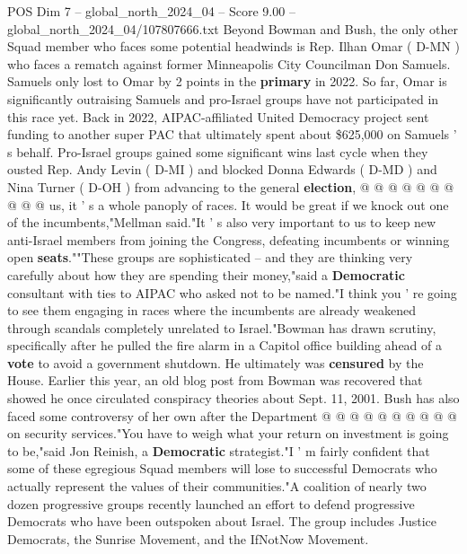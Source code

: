 \begin{textsample}{POS Dim 7 – global\_north\_2024\_04 – Score 9.00 – global\_north\_2024\_04/107807666.txt}
Beyond Bowman and Bush, the only other Squad member who faces some potential headwinds is Rep.
Ilhan Omar ( D-MN ) who faces a rematch against former Minneapolis City Councilman Don Samuels.
Samuels only lost to Omar by 2 points in the \textbf{primary} in 2022.
So far, Omar is significantly outraising Samuels and pro-Israel groups have not participated in this race yet.
Back in 2022, AIPAC-affiliated United Democracy project sent funding to another super PAC that ultimately spent about \$625,000 on Samuels ' s behalf.
Pro-Israel groups gained some significant wins last cycle when they ousted Rep.
Andy Levin ( D-MI ) and blocked Donna Edwards ( D-MD ) and Nina Turner ( D-OH ) from advancing to the general \textbf{election}, @ @ @ @ @ @ @ @ @ @ us, it ' s a whole panoply of races.
It would be great if we knock out one of the incumbents,"Mellman said."It ' s also very important to us to keep new anti-Israel members from joining the Congress, defeating incumbents or winning open \textbf{seats}.""These groups are sophisticated -- and they are thinking very carefully about how they are spending their money,"said a \textbf{Democratic} consultant with ties to AIPAC who asked not to be named."I think you ' re going to see them engaging in races where the incumbents are already weakened through scandals completely unrelated to Israel."Bowman has drawn scrutiny, specifically after he pulled the fire alarm in a Capitol office building ahead of a \textbf{vote} to avoid a government shutdown.
He ultimately was \textbf{censured} by the House.
Earlier this year, an old blog post from Bowman was recovered that showed he once circulated conspiracy theories about Sept. 11, 2001.
Bush has also faced some controversy of her own after the Department @ @ @ @ @ @ @ @ @ @ on security services."You have to weigh what your return on investment is going to be,"said Jon Reinish, a \textbf{Democratic} strategist."I ' m fairly confident that some of these egregious Squad members will lose to successful Democrats who actually represent the values of their communities."A coalition of nearly two dozen progressive groups recently launched an effort to defend progressive Democrats who have been outspoken about Israel.
The group includes Justice Democrats, the Sunrise Movement, and the IfNotNow Movement.

\end{textsample}
